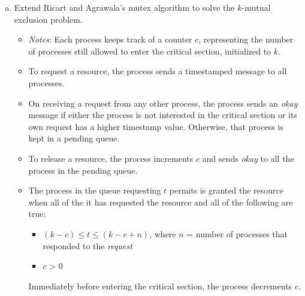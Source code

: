 \documentclass[11pt]{article}
\newcounter{problem}
\begin{document}
\begin{enumerate}
\begin{enumerate}[(a)]
  \item Extend Ricart and Agrawala's mutex algorithm to solve the $k$-mutual
    exclusion problem.

    \begin{itemize}
    \item \emph{Notes}: Each process keeps track of a counter $c$, representing
      the number of processes still allowed to enter the critical section,
      initialized to $k$.
    \item To request a resource, the process sends a timestamped message to all
      processes.
    \item On receiving a request from any other process, the process sends an
      \emph{okay} message if either the process is not interested in the
      critical section or its own request has a higher timestamp
      value. Otherwise, that process is kept in a pending queue.
    \item To release a resource, the process increments $c$ and sends
      \emph{okay} to all the process in the pending queue.
    \item The process in the queue requesting $t$ permits is granted the resource when all of the it has requested the resource and all of the following are true:
    \begin{itemize}                                                 
    \item $(k-c)\leq t \leq(k-c+n)$, where $n$ = number of processes that responded to the \emph{request}
    \item $c$ > 0                                                   
    \end{itemize}                                                   
    Immediately before entering the critical section, the process decrements $c$.
    \end{itemize} 

  \end{enumerate}                                                 
\end{enumerate}                                                 
\end{document}
